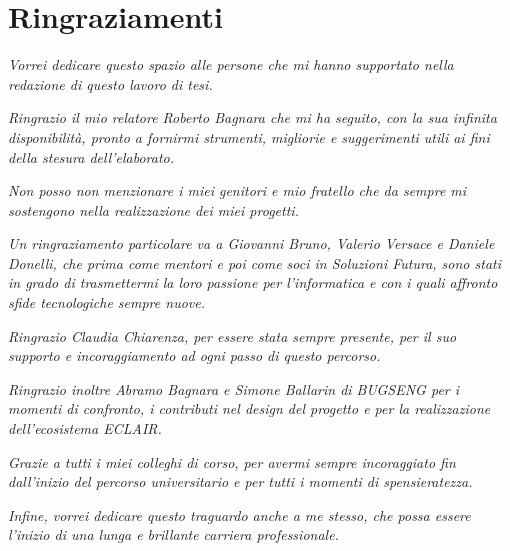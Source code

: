 \chapter*{Ringraziamenti}

\emph{Vorrei dedicare questo spazio alle persone che mi hanno supportato nella redazione di questo lavoro di tesi.\\}

\emph{Ringrazio il mio relatore Roberto Bagnara che mi ha seguito, con la sua infinita disponibilità, pronto a fornirmi strumenti, migliorie e suggerimenti utili ai fini della stesura dell'elaborato.\\}

\emph{Non posso non menzionare i miei genitori e mio fratello che da sempre mi sostengono nella realizzazione dei miei progetti.\\}

\emph{Un ringraziamento particolare va a Giovanni Bruno, Valerio Versace e Daniele Donelli, che prima come mentori e poi come soci in Soluzioni Futura, sono stati in grado di trasmettermi la loro passione per l'informatica  e con i quali affronto sfide tecnologiche sempre nuove.\\}

\emph{Ringrazio Claudia Chiarenza, per essere stata sempre presente, per il suo supporto e incoraggiamento ad ogni passo di questo percorso.\\}

\emph{Ringrazio inoltre Abramo Bagnara e Simone Ballarin di BUGSENG per i momenti di confronto, i contributi nel design del progetto e per la realizzazione dell'ecosistema ECLAIR.\\}

\emph{Grazie a tutti i miei colleghi di corso, per avermi sempre incoraggiato fin dall'inizio del percorso universitario e per tutti i momenti di spensieratezza.\\}

\emph{Infine, vorrei dedicare questo traguardo anche a me stesso, che possa essere l'inizio di una lunga e brillante carriera professionale.}